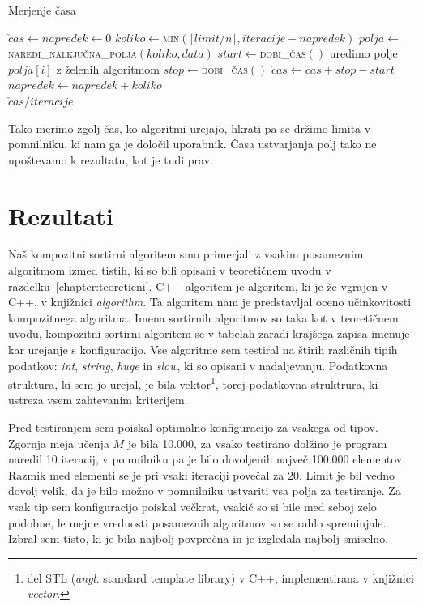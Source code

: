 \documentclass[a4paper,oneside,12pt]{article}
\begin{document}
\begin{algorithm}[h!t!]
  \caption{Merjenje časa}\label{algo:time}
  \begin{algorithmic}[1]
    \State \label{line:init} $\check{c}as \gets napredek \gets 0$
    \Repeat \label{line:repeattimestart}
      \State \label{line:koliko} $koliko \gets $\textsc{min}$(\lfloor limit / n \rfloor, iteracije - napredek)$
      \State \label{line:polja} $polja \gets $\textsc{naredi\_nalkjučna\_polja}$(koliko, data)$
      \State \label{line:getstarttime} $start \gets $\textsc{dobi\_čas}$()$
       \label{line:beginsortfor}
        \State uredimo polje $polja[i]$ z želenih algoritmom
      \EndFor \label{line:endsortfor}
      \State \label{line:getendtime} $stop \gets $\textsc{dobi\_čas}$()$
      \State $\check{c}as \gets \check{c}as + stop - start$
      \State $napredek \gets napredek + koliko$
     \label{line:repeattimeend} \\
    \Return \label{line:returnaverage}$\check{c}as / iteracije$
  \end{algorithmic}
\end{algorithm}
Tako merimo zgolj čas, ko algoritmi urejajo, hkrati pa se držimo limita v pomnilniku, ki
nam ga je določil uporabnik. Časa ustvarjanja polj tako ne upoštevamo k rezultatu, kot
je tudi prav.


\pagebreak
\section{Rezultati}
Naš kompozitni sortirni algoritem smo primerjali z vsakim posameznim algoritmom izmed
tistih, ki so bili opisani v teoretičnem uvodu v razdelku~\ref{chapter:teoreticni}. C++ algoritem
je algoritem, ki je že vgrajen v C++, v knjižnici \emph{algorithm}. Ta algoritem
nam je predstavljal oceno učinkovitosti kompozitnega algoritma.
Imena sortirnih algoritmov so taka kot v teoretičnem uvodu, kompozitni sortirni algoritem se v tabelah 
zaradi krajšega zapisa imenuje kar urejanje s konfiguracijo.
Vse algoritme sem testiral na štirih različnih tipih podatkov: 
\emph{int}, \emph{string}, \emph{huge} in \emph{slow}, ki so opisani v nadaljevanju.
Podatkovna struktura, ki sem jo urejal, je bila vektor\footnote{del STL
(\emph{angl.} standard template library) v C++,
implementirana v knjižnici \emph{vector}.}, torej podatkovna struktrura, ki
ustreza vsem zahtevanim kriterijem.

Pred testiranjem sem poiskal optimalno konfiguracijo za vsakega od tipov. Zgornja meja
učenja $M$ je bila 10.000, za vsako testirano dolžino je program naredil 10 iteracij, v pomnilniku
pa je bilo dovoljenih največ 100.000 elementov. Razmik med elementi se je pri vsaki iteraciji povečal za 20.
Limit je bil vedno dovolj velik, da je bilo možno v pomnilniku ustvariti vsa
polja za testiranje. Za vsak tip sem konfiguracijo poiskal večkrat, vsakič so si
bile med seboj zelo podobne, le mejne vrednosti posameznih algoritmov so se
rahlo spreminjale. Izbral sem tisto, ki je bila najbolj povprečna in je
izgledala najbolj smiselno.
\end{document}
